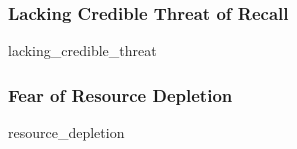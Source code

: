 \documentclass[hyphens, crop=false]{standalone}
\begin{document}
		\subsubsection*{Lacking Credible Threat of Recall}
			{lacking_credible_threat}
			
		\subsubsection*{Fear of Resource Depletion}
			{resource_depletion}
		
	
		
	\newpage
	\printbibliography
	
	
	
\end{document}
